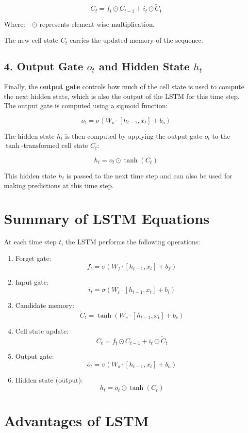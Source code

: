 \documentclass[10pt]{article}
\begin{document}
\[
C_t = f_t \odot C_{t-1} + i_t \odot \tilde{C}_t
\]

Where:
- \( \odot \) represents element-wise multiplication.

The new cell state \( C_t \) carries the updated memory of the sequence.

\subsection{ 4. Output Gate \( o_t \) and Hidden State \( h_t \)}
Finally, the {\bf output gate} controls how much of the cell state is used to compute the next hidden state, which is also the output of the LSTM for this time step. The output gate is computed using a sigmoid function:

\[
o_t = \sigma(W_o \cdot [h_{t-1}, x_t] + b_o)
\]

The hidden state \( h_t \) is then computed by applying the output gate \( o_t \) to the \( \tanh \)-transformed cell state \( C_t \):

\[
h_t = o_t \odot \tanh(C_t)
\]

This hidden state \( h_t \) is passed to the next time step and can also be used for making predictions at this time step.

\section{ Summary of LSTM Equations}
At each time step \( t \), the LSTM performs the following operations:

\begin{enumerate}
   \item Forget gate:
      \[
      f_t = \sigma(W_f \cdot [h_{t-1}, x_t] + b_f)
      \]
   \item Input gate:
      \[
      i_t = \sigma(W_i \cdot [h_{t-1}, x_t] + b_i)
      \]
   \item Candidate memory:
      \[
      \tilde{C}_t = \tanh(W_c \cdot [h_{t-1}, x_t] + b_c)
      \]
   \item Cell state update:
      \[
      C_t = f_t \odot C_{t-1} + i_t \odot \tilde{C}_t
      \]
   \item Output gate:
      \[
      o_t = \sigma(W_o \cdot [h_{t-1}, x_t] + b_o)
      \]
   \item Hidden state (output):
      \[
      h_t = o_t \odot \tanh(C_t)
      \]
\end{enumerate}

\section{ Advantages of LSTM}
\end{document}
